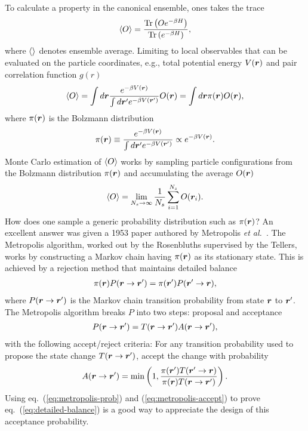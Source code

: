 To calculate a property in the canonical ensemble, ones takes the trace
\begin{align}
\braket{O} = \dfrac{\text{Tr}\left(Oe^{-\beta H}\right)}{\text{Tr}\left(e^{-\beta H}\right)},
\end{align}
where $\braket{}$ denotes ensemble average. Limiting to local observables that can be evaluated on the particle coordinates, e.g., total potential energy $V(\boldsymbol{r})$ and pair correlation function $g(r)$
\begin{align} \label{eq:int-obs}
\braket{O} = \int d\boldsymbol{r} \dfrac{e^{-\beta V(\boldsymbol{r})}}{\int d\boldsymbol{r}' e^{-\beta V(\boldsymbol{r}')}} O(\boldsymbol{r}) = \int d\boldsymbol{r} \pi(\boldsymbol{r})O(\boldsymbol{r}),
\end{align}
where $\pi(\boldsymbol{r})$ is the Bolzmann distribution
\begin{align}
\pi(\boldsymbol{r}) \equiv \dfrac{e^{-\beta V(\boldsymbol{r})}}{\int d\boldsymbol{r}' e^{-\beta V(\boldsymbol{r}')}} \propto e^{-\beta V(\boldsymbol{r})}.
\end{align}
Monte Carlo estimation of $\braket{O}$ works by sampling particle configurations from the Bolzmann distribution $\pi(\boldsymbol{r})$ and accumulating the average $O(\boldsymbol{r})$
\begin{align}
\braket{O} = \lim\limits_{N_s\rightarrow\infty} \frac{1}{N_s} \sum\limits_{i=1}^{N_s} O(\boldsymbol{r}_i).
\end{align}
How does one sample a generic probability distribution such as $\pi(\boldsymbol{r})$?
An excellent answer was given a 1953 paper authored by Metropolis \textit{et al.}~\cite{Metropolis1953}. The Metropolis algorithm, worked out by the Rosenbluths supervised by the Tellers, works by constructing a Markov chain having $\pi(\boldsymbol{r})$ as its stationary state. This is achieved by a rejection method that maintains detailed balance
\begin{align} \label{eq:detailed-balance}
\pi(\boldsymbol{r})P(\boldsymbol{r}\rightarrow\boldsymbol{r}')=\pi(\boldsymbol{r}')P(\boldsymbol{r}'\rightarrow\boldsymbol{r}),
\end{align}
where $P(\boldsymbol{r}\rightarrow\boldsymbol{r}')$ is the Markov chain transition probability from state $\boldsymbol{r}$ to $\boldsymbol{r}'$. The Metropolis algorithm breaks $P$ into two steps: proposal and acceptance
\begin{align} \label{eq:metropolis-prob}
P(\boldsymbol{r}\rightarrow\boldsymbol{r}') = T(\boldsymbol{r}\rightarrow\boldsymbol{r}')A(\boldsymbol{r}\rightarrow\boldsymbol{r}'),
\end{align}
with the following accept/reject criteria: For any transition probability used to propose the state change $T(\boldsymbol{r}\rightarrow\boldsymbol{r}')$, accept the change with probability
\begin{align} \label{eq:metropolis-accept}
A(\boldsymbol{r}\rightarrow\boldsymbol{r}') = \min\left(1, \dfrac{\pi(\boldsymbol{r}')T(\boldsymbol{r}'\rightarrow\boldsymbol{r})}{\pi(\boldsymbol{r})T(\boldsymbol{r}\rightarrow\boldsymbol{r}')}\right).
\end{align}
Using eq.~(\ref{eq:metropolis-prob}) and (\ref{eq:metropolis-accept}) to prove eq.~(\ref{eq:detailed-balance}) is a good way to appreciate the design of this acceptance probability.

